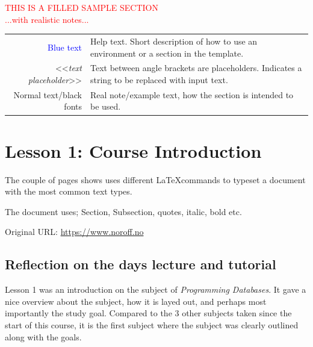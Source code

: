 
{\begin{center}
    \textcolor{red}{\Huge{THIS IS A FILLED SAMPLE SECTION}\\[4mm] ...with realistic notes...}

    \begin{tabular}{r @{: } p{80mm}}
        {\textcolor{blue}{Blue text}} &  Help text. Short description of how to use an environment or a section in the template.\\
        <<{\emph{text placeholder}}>> & Text between angle brackets are placeholders. Indicates a string to be replaced with input text.\\
        Normal text/black fonts & Real note/example text, how the section is intended to be used.
    \end{tabular}

\end{center}

\section{Lesson 1: Course Introduction}

\begin{notes}
    The couple of pages shows uses different \LaTeX commands to typeset a document with the most common text types.

    The document uses; Section, Subsection, quotes, italic, bold etc.
\end{notes}

Original URL: \url{https://www.noroff.no}


\subsection{Reflection on the days lecture and tutorial}

Lesson 1 was an introduction on the subject of {\emph{Programming Databases}}. It gave a nice overview about the subject, how it is layed out, and perhaps most importantly the study goal. Compared to the 3 other subjects taken since the start of this course, it is the first subject where the subject was clearly outlined along with the goals.

}

